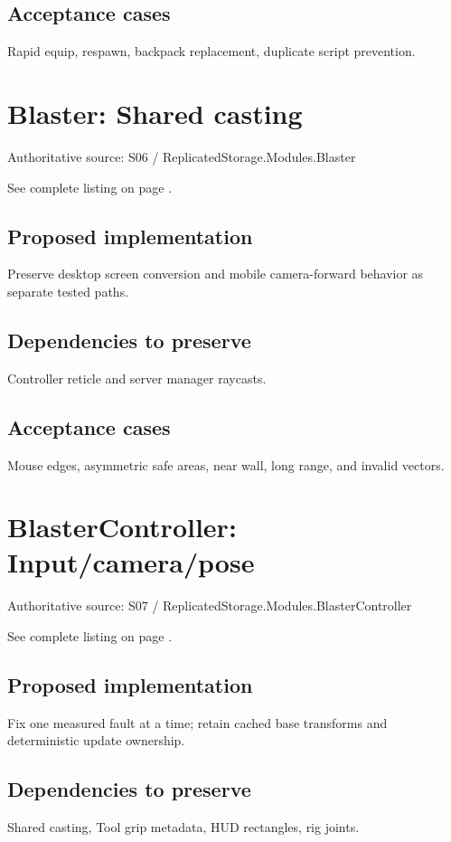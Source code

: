 \subsection{Acceptance cases}
Rapid equip, respawn, backpack replacement, duplicate script prevention.\allowbreak{}

\section{Blaster: Shared casting}
Authoritative source: S06 /\allowbreak{} ReplicatedStorage.\allowbreak{}Modules.\allowbreak{}Blaster

See complete listing on page \pageref{src:S06}.

\subsection{Proposed implementation}
Preserve desktop screen conversion and mobile camera-forward behavior as separate tested paths.\allowbreak{}

\subsection{Dependencies to preserve}
Controller reticle and server manager raycasts.\allowbreak{}

\subsection{Acceptance cases}
Mouse edges, asymmetric safe areas, near wall, long range, and invalid vectors.\allowbreak{}

\section{BlasterController: Input/\allowbreak{}camera/\allowbreak{}pose}
Authoritative source: S07 /\allowbreak{} ReplicatedStorage.\allowbreak{}Modules.\allowbreak{}BlasterController

See complete listing on page \pageref{src:S07}.

\subsection{Proposed implementation}
Fix one measured fault at a time; retain cached base transforms and deterministic update ownership.\allowbreak{}

\subsection{Dependencies to preserve}
Shared casting, Tool grip metadata, HUD rectangles, rig joints.\allowbreak{}


